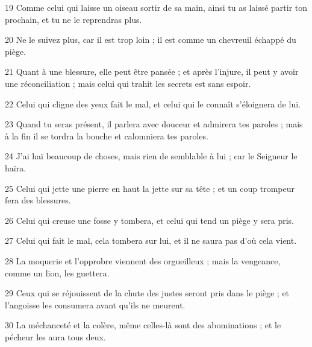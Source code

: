 \par 19 Comme celui qui laisse un oiseau sortir de sa main, ainsi tu as laissé partir ton prochain, et tu ne le reprendras plus.
\par 20 Ne le suivez plus, car il est trop loin ; il est comme un chevreuil échappé du piège.
\par 21 Quant à une blessure, elle peut être pansée ; et après l'injure, il peut y avoir une réconciliation ; mais celui qui trahit les secrets est sans espoir.
\par 22 Celui qui cligne des yeux fait le mal, et celui qui le connaît s'éloignera de lui.
\par 23 Quand tu seras présent, il parlera avec douceur et admirera tes paroles ; mais à la fin il se tordra la bouche et calomniera tes paroles.
\par 24 J'ai haï beaucoup de choses, mais rien de semblable à lui ; car le Seigneur le haïra.
\par 25 Celui qui jette une pierre en haut la jette sur sa tête ; et un coup trompeur fera des blessures.
\par 26 Celui qui creuse une fosse y tombera, et celui qui tend un piège y sera pris.
\par 27 Celui qui fait le mal, cela tombera sur lui, et il ne saura pas d'où cela vient.
\par 28 La moquerie et l'opprobre viennent des orgueilleux ; mais la vengeance, comme un lion, les guettera.
\par 29 Ceux qui se réjouissent de la chute des justes seront pris dans le piège ; et l'angoisse les consumera avant qu'ils ne meurent.
\par 30 La méchanceté et la colère, même celles-là sont des abominations ; et le pécheur les aura tous deux.


